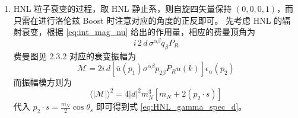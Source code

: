\documentclass[printMode=false, declarePage=false]{ecnuthesis}
\begin{document}
\begin{appendix}
\begin{enumerate}
\begin{align}
            |\overrightarrow{p}_3|_{\pm} & = \frac{1}{2}(m_\mu \pm |\overrightarrow{p}_1| - E_1)                                                                           \\
          \end{align}
          且
          \begin{equation}
            0 < |\overrightarrow{p}_1| < \frac{m_\mu^2-m_N^2}{2 m_\mu}
          \end{equation}
          完成积分，并按照对应极化态代入 $s$ 即可得到式 \ref{eq:rho_mu}、\ref{eq:mu_HNL_spec}、\ref{eq:mu_HNL_pol}。
          
    \item HNL 粒子衰变的过程，取 HNL 静止系，则自旋四矢量保持 $(0,0,0,1)$，而只需在进行洛伦兹 Boost 时注意对应的角度的正反即可。
          先考虑 HNL 的辐射衰变，根据 \ref{eq:int_mag_nu} 给出的作用量，相应的费曼顶角为
          \begin{equation}
            i \, 2 \, d \, \sigma^{\alpha\beta} q_\beta P_R
          \end{equation}
          费曼图见 2.3.2 对应的衰变振幅为
          \begin{equation}
            \mathcal{M} = 2i \, d [\bar{u}(p_1) \sigma^{\alpha\beta} p_{2\beta} P_R u(k)] \epsilon_\alpha(p_2)
          \end{equation}
          而振幅模方则为
          \begin{equation}
            \langle |\mathcal{M}| \rangle^2 = 4 |d|^2 m_N^3 [m_N + 2 (p_2 \cdot s)] 
          \end{equation}
          代入 $p_2 \cdot s = \frac{m_N}{2} \cos{\theta_s}$ 即可得到式 \ref{eq:HNL_gamma_spec_d}。
          

\end{enumerate}
\end{appendix}
\end{document}
